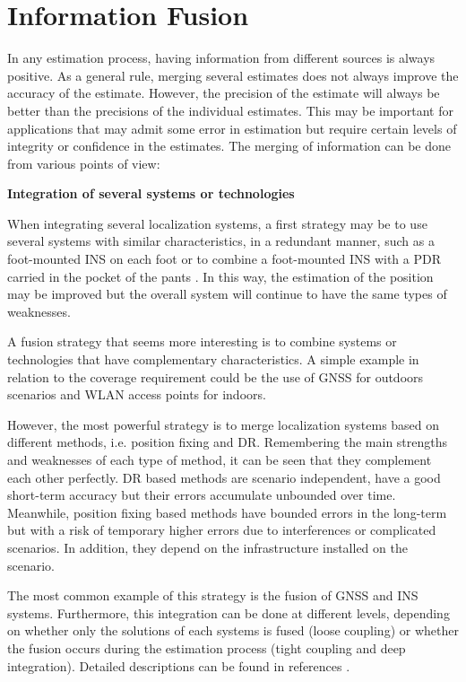 \section{Information Fusion}
\label{sec:2_4_fusion}
In any estimation process, having information from different sources is always positive.
As a general rule, merging several estimates does not always improve the accuracy of the estimate. 
However, the precision of the estimate will always be better than the precisions of the individual estimates.
This may be important for applications that may admit some error in estimation but require certain levels of integrity or confidence in the estimates.
The merging of information can be done from various points of view:
\newpage
\begin{description}
	\item \textbf{Integration of several systems or technologies}
	
	When integrating several localization systems, a first strategy may be to use several systems with similar characteristics, in a redundant manner, such as a foot-mounted INS on each foot \cite{prateek_data_2013} or to combine a foot-mounted INS with a PDR carried in the pocket of the pants \cite{bousdar_ahmed_loose_2017}.
	In this way, the estimation of the position may be improved but the overall system will continue to have the same types of weaknesses.
	
	A fusion strategy that seems more interesting is to combine systems or technologies that have complementary characteristics.
	A simple example in relation to the coverage requirement could be the use of GNSS for outdoors scenarios and WLAN access points for indoors.
	
	However, the most powerful strategy is to merge localization systems based on different methods, i.e. position fixing and DR.
	Remembering the main strengths and weaknesses of each type of method, it can be seen that they complement each other perfectly.
	DR based methods are scenario independent, have a good short-term accuracy but their errors accumulate unbounded over time.
	Meanwhile, position fixing based methods have bounded errors in the long-term but with a risk of temporary higher errors due to interferences or complicated scenarios. In addition, they depend on the infrastructure installed on the scenario.
	
	The most common example of this strategy is the fusion of GNSS and INS systems.
	Furthermore, this integration can be done at different levels, depending on whether only the solutions of each systems is fused (loose coupling) or whether the fusion occurs during the estimation process (tight coupling and deep integration). 
	Detailed descriptions can be found in references \cite{grewal_global_2001, titterton_strapdown_2004, groves_principles_2008}.		


\end{description}

